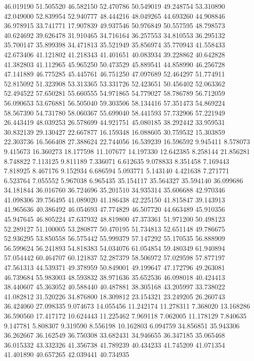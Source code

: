 46.019190
51.505520
46.582150
52.470786
50.549019
49.248754
53.310890
42.049000
52.839954
52.940777
48.444216
48.049265
44.693260
44.908846
36.978915
33.741771
17.907839
49.937546
50.976849
50.557595
48.798573
40.624692
39.626478
31.910465
34.716164
36.257553
34.810553
36.295132
35.700147
35.899398
34.471813
35.521949
35.856974
35.770943
41.558433
42.673406
41.121802
41.218343
41.401651
40.083934
39.228862
40.642828
41.382803
41.112965
45.965250
50.473529
45.889541
44.858990
46.256728
47.141889
46.775285
45.445761
46.751250
47.097689
52.464297
51.774911
52.815092
51.323908
53.313365
53.331726
52.423651
50.456402
52.063362
52.494522
57.650281
55.660555
54.971865
54.779027
58.786789
56.712059
56.090653
53.676881
56.505040
59.303506
58.134416
57.351473
54.869224
58.567390
54.731780
58.060367
55.699040
58.441593
57.732906
57.221949
26.443419
48.039253
26.578699
44.921751
45.080185
38.292442
33.959531
30.832139
29.130427
22.667877
16.159348
16.088605
30.759532
15.303859
22.303736
16.566408
27.388624
22.744056
16.539239
16.596592
9.945411
8.578073
9.415673
16.360273
18.177598
11.107677
14.197330
12.642385
8.258144
21.856281
8.748822
7.113125
9.811189
7.336071
6.612635
9.078833
8.351458
7.169443
7.818925
8.467176
9.152934
6.686594
5.093771
5.143140
4.421638
7.271771
6.523764
7.055552
5.967038
6.965435
35.154117
35.564327
35.594140
36.099686
34.181844
36.016760
36.724696
35.201510
34.935314
35.606688
42.970346
41.098306
39.756495
41.089020
41.186438
42.225150
41.815847
39.143913
41.965636
40.386492
46.054693
47.774829
46.507720
44.663489
45.910356
45.947645
46.805224
47.637932
48.819800
47.373361
51.971200
50.498123
52.289127
51.100005
53.280877
50.470195
51.734813
52.651148
49.786675
52.936295
53.850558
56.575442
55.999379
57.147292
55.170535
56.888909
56.599624
56.241893
54.818383
54.034076
61.054854
59.480349
61.940894
57.054442
60.464707
60.121837
52.287379
58.506972
57.029598
57.877197
47.561313
44.539371
49.378959
50.849001
49.199647
47.172796
49.263081
46.739684
55.983003
48.593832
38.971636
35.652536
46.098018
40.424413
38.440607
45.363052
40.588440
40.487881
38.305168
43.205997
33.738022
41.082812
31.520226
34.876800
18.309812
23.154321
23.249205
26.260743
36.424060
27.098335
9.074673
14.055456
11.242174
11.278311
7.368020
13.168286
36.590560
17.417172
10.624443
11.225462
7.969118
7.062005
11.178129
7.840635
9.147781
5.808307
9.319590
8.556198
10.162803
6.094759
34.856851
35.943306
36.262667
36.162549
36.750308
33.682431
34.946655
36.347185
35.065468
36.015332
43.332326
41.356738
41.789239
40.434233
41.745209
41.071354
41.401890
40.657265
42.039441
40.734935
